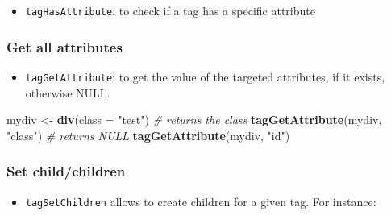 \documentclass[
]{book}
\newenvironment{Shaded}{\begin{snugshade}}{\end{snugshade}}
\newcommand{\CommentTok}[1]{\textcolor[rgb]{0.56,0.35,0.01}{\textit{#1}}}
\newcommand{\DataTypeTok}[1]{\textcolor[rgb]{0.13,0.29,0.53}{#1}}
\newcommand{\KeywordTok}[1]{\textcolor[rgb]{0.13,0.29,0.53}{\textbf{#1}}}
\newcommand{\NormalTok}[1]{#1}
\newcommand{\OperatorTok}[1]{\textcolor[rgb]{0.81,0.36,0.00}{\textbf{#1}}}
\newcommand{\StringTok}[1]{\textcolor[rgb]{0.31,0.60,0.02}{#1}}
\providecommand{\tightlist}{%
  \setlength{\itemsep}{0pt}\setlength{\parskip}{0pt}}
\begin{document}
\begin{itemize}
\tightlist
\item
  \texttt{tagHasAttribute}: to check if a tag has a specific attribute
\end{itemize}

\begin{Shaded}
\end{Shaded}

\hypertarget{get-all-attributes}{%
\subsubsection{Get all attributes}\label{get-all-attributes}}

\begin{itemize}
\tightlist
\item
  \texttt{tagGetAttribute}: to get the value of the targeted attributes, if it exists, otherwise NULL.
\end{itemize}

\begin{Shaded}
\begin{Highlighting}[]
\NormalTok{mydiv <-}\StringTok{ }\KeywordTok{div}\NormalTok{(}\DataTypeTok{class =} \StringTok{"test"}\NormalTok{)}
\CommentTok{# returns the class}
\KeywordTok{tagGetAttribute}\NormalTok{(mydiv, }\StringTok{"class"}\NormalTok{)}
\CommentTok{# returns NULL}
\KeywordTok{tagGetAttribute}\NormalTok{(mydiv, }\StringTok{"id"}\NormalTok{)}
\end{Highlighting}
\end{Shaded}

\hypertarget{set-childchildren}{%
\subsubsection{Set child/children}\label{set-childchildren}}

\begin{itemize}
\tightlist
\item
  \texttt{tagSetChildren} allows to create children for a given tag. For instance:
\end{itemize}
\end{document}
